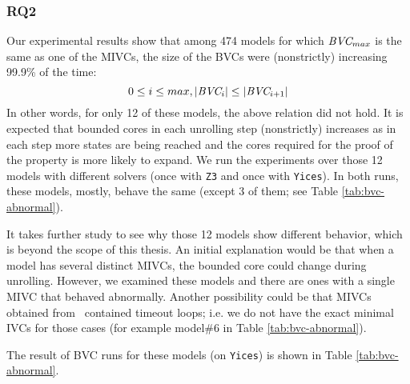 \vspace{0.1in}
\subsubsection{RQ2}
Our experimental results show that among 474 models for which $\textit{BVC} _{max}$ is the same as one of the MIVCs, the size of the BVCs were (nonstrictly) increasing 99.9\% of the time:
      $$ 0 \leq i \le max, |\textit{BVC} _{i}| \leq |\textit{BVC} _{i+1}|$$
      In other words, for only 12 of these models, the above relation did not hold.
      It is expected that bounded cores in each unrolling step (nonstrictly) increases as in each step more states are being reached and the cores required for the proof of the property is more likely to expand.
      We run the experiments over those 12 models with different solvers (once with \texttt{Z3} and once with \texttt{Yices}). In both runs, these models, mostly, behave the same (except 3 of them; see Table \ref{tab:bvc-abnormal}).

      It takes further study to see why those 12 models show different behavior, which is beyond the scope of this thesis. An initial explanation would be that when a model has several distinct MIVCs, the bounded core could change during unrolling. However, we examined these models and there are ones with a single MIVC that behaved abnormally. Another possibility could be that MIVCs obtained from \aivcalg ~contained timeout loops; i.e. we do not have the exact minimal IVCs for those cases (for example model\#6 in Table \ref{tab:bvc-abnormal}).

       The result of BVC runs for these models (on \texttt{Yices}) is shown in Table \ref{tab:bvc-abnormal}.

